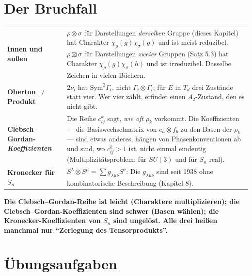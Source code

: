 \section{Der Bruchfall}

\begin{warnung}
\begin{center}
{\small
\renewcommand{\arraystretch}{1.5}
\begin{tabular}{@{}P{3.2cm}P{5.4cm}@{}}
\toprule
\textbf{Innen und außen} & $\rho\otimes\sigma$ für Darstellungen \emph{derselben} Gruppe (dieses Kapitel) hat Charakter $\chi_\rho(g)\chi_\sigma(g)$ und ist meist reduzibel. $\rho\boxtimes\sigma$ für Darstellungen \emph{zweier} Gruppen (Satz 5.3) hat Charakter $\chi_\rho(g)\chi_\sigma(h)$ und ist irreduzibel. Dasselbe Zeichen in vielen Büchern.\\
\textbf{Oberton $\neq$ Produkt} & $2\nu_i$ hat $\mathrm{Sym}^{2}\Gamma_i$, nicht $\Gamma_i\otimes\Gamma_i$; für $E$ in $T_d$ drei Zustände statt vier. Wer vier zählt, erfindet einen $A_2$-Zustand, den es nicht gibt.\\
\textbf{Clebsch--Gordan-\emph{Koeffizienten}} & Die Reihe $c_{ij}^{k}$ sagt, \emph{wie oft} $\rho_k$ vorkommt. Die Koeffizienten --- die Basiswechselmatrix von $e_a\otimes f_b$ zu den Basen der $\rho_k$ --- sind etwas anderes, hängen von Phasenkonventionen ab und sind, wo $c_{ij}^{k} > 1$ ist, nicht einmal eindeutig (Multiplizitätsproblem; für $SU(3)$ und für $S_n$ real).\\
\textbf{Kronecker für $S_n$} & $S^{\lambda}\otimes S^{\mu} = \sum g_{\lambda\mu\nu}S^{\nu}$: Die $g_{\lambda\mu\nu}$ sind seit 1938 ohne kombinatorische Beschreibung (Kapitel 8).\\
\bottomrule
\end{tabular}}
\end{center}

\begin{center}
\begin{minipage}{0.9\textwidth}
\textbf{Die Clebsch--Gordan-Reihe ist leicht (Charaktere multiplizieren); die Clebsch--Gordan-Koeffizienten sind schwer (Basen wählen); die Kronecker-Koeffizienten von $S_n$ sind ungelöst. Alle drei heißen manchmal nur \enquote{Zerlegung des Tensorprodukts}.}
\end{minipage}
\end{center}
\end{warnung}

\section{Übungsaufgaben}


